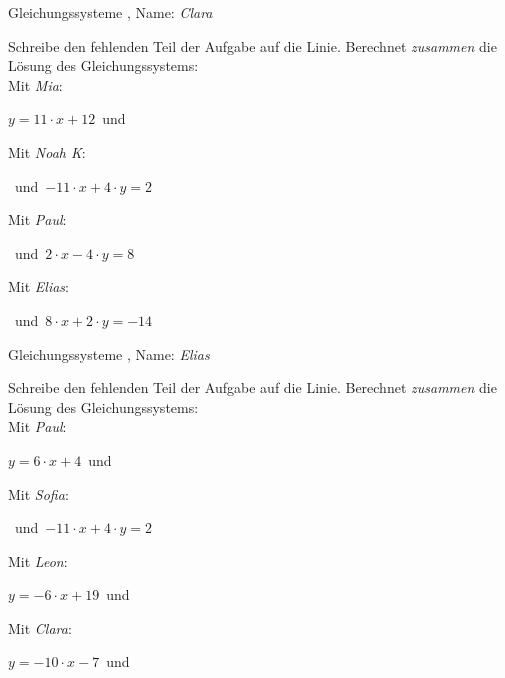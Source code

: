 \begin{center}\large Gleichungssysteme
, Name: \emph{Clara}\end{center}
Schreibe den fehlenden Teil der Aufgabe auf die Linie. Berechnet \emph{zusammen} die Lösung des Gleichungssystems:
\\
\vfill Mit \emph{Mia}:
\begin{center}$y=11\cdot x+12$\mbox{ }und\mbox{ }
\underline{}\end{center}
\vfill Mit \emph{Noah K}:
\begin{center}\underline{}
\mbox{ }und\mbox{ }$-11\cdot x+4\cdot y=2$\end{center}
\vfill Mit \emph{Paul}:
\begin{center}\underline{}
\mbox{ }und\mbox{ }$2\cdot x-4\cdot y=8$\end{center}
\vfill Mit \emph{Elias}:
\begin{center}\underline{}
\mbox{ }und\mbox{ }$8\cdot x+2\cdot y=-14$\end{center}
\newpage
\begin{center}\large Gleichungssysteme
, Name: \emph{Elias}\end{center}
Schreibe den fehlenden Teil der Aufgabe auf die Linie. Berechnet \emph{zusammen} die Lösung des Gleichungssystems:
\\
\vfill Mit \emph{Paul}:
\begin{center}$y=6\cdot x+4$\mbox{ }und\mbox{ }
\underline{}\end{center}
\vfill Mit \emph{Sofia}:
\begin{center}\underline{}
\mbox{ }und\mbox{ }$-11\cdot x+4\cdot y=2$\end{center}
\vfill Mit \emph{Leon}:
\begin{center}$y=-6\cdot x+19$\mbox{ }und\mbox{ }
\underline{}\end{center}
\vfill Mit \emph{Clara}:
\begin{center}$y=-10\cdot x-7$\mbox{ }und\mbox{ }\underline{}
\end{center}
